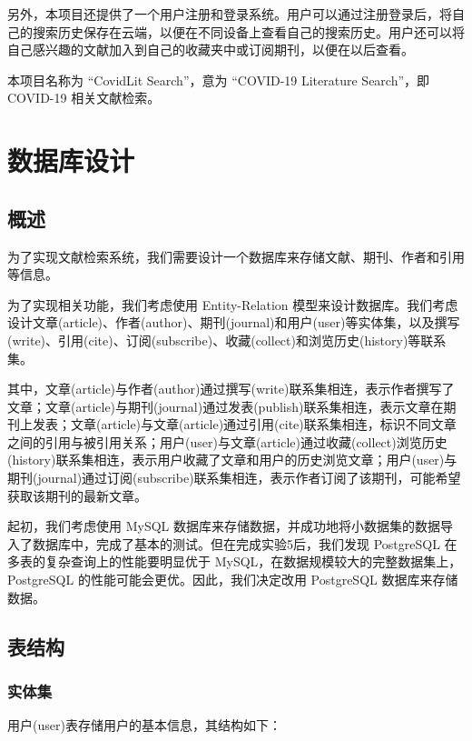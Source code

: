 \documentclass[UTF8,openany]{ctexbook}
\begin{document}
另外，本项目还提供了一个用户注册和登录系统。用户可以通过注册登录后，将自己的搜索历史保存在云端，以便在不同设备上查看自己的搜索历史。用户还可以将自己感兴趣的文献加入到自己的收藏夹中或订阅期刊，以便在以后查看。

本项目名称为 ``CovidLit Search''，意为 ``COVID-19 Literature Search''，即 COVID-19 相关文献检索。

\chapter{数据库设计}

\section{概述}
\label{sec:overviewOfDatabaseDesign}

为了实现文献检索系统，我们需要设计一个数据库来存储文献、期刊、作者和引用等信息。

为了实现相关功能，我们考虑使用 Entity-Relation 模型来设计数据库。我们考虑设计文章(article)、作者(author)、期刊(journal)和用户(user)等实体集，以及撰写(write)、引用(cite)、订阅(subscribe)、收藏(collect)和浏览历史(history)等联系集。

其中，文章(article)与作者(author)通过撰写(write)联系集相连，表示作者撰写了文章；文章(article)与期刊(journal)通过发表(publish)联系集相连，表示文章在期刊上发表；文章(article)与文章(article)通过引用(cite)联系集相连，标识不同文章之间的引用与被引用关系；用户(user)与文章(article)通过收藏(collect)浏览历史(history)联系集相连，表示用户收藏了文章和用户的历史浏览文章；用户(user)与期刊(journal)通过订阅(subscribe)联系集相连，表示作者订阅了该期刊，可能希望获取该期刊的最新文章。

起初，我们考虑使用 MySQL 数据库来存储数据，并成功地将小数据集的数据导入了数据库中，完成了基本的测试。但在完成实验5后，我们发现 PostgreSQL 在多表的复杂查询上的性能要明显优于 MySQL，在数据规模较大的完整数据集上，PostgreSQL 的性能可能会更优。因此，我们决定改用 PostgreSQL 数据库来存储数据。

\section{表结构}

\subsection{实体集}

用户(user)表存储用户的基本信息，其结构如下：
\end{document}
